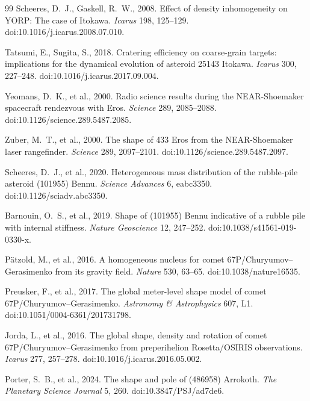 \documentclass[11pt,a4paper]{article}
\begin{document}
\begin{thebibliography}{99}
Scheeres, D.~J., Gaskell, R.~W., 2008. Effect of density inhomogeneity on YORP: The case of Itokawa. \emph{Icarus} 198, 125--129.
doi:10.1016/j.icarus.2008.07.010.

Tatsumi, E., Sugita, S., 2018. Cratering efficiency on coarse-grain
targets: implications for the dynamical evolution of asteroid 25143
Itokawa. \emph{Icarus} 300, 227--248. doi:10.1016/j.icarus.2017.09.004.

Yeomans, D.~K., et al., 2000. Radio science results during the
NEAR-Shoemaker spacecraft rendezvous with Eros. \emph{Science}
289, 2085--2088. doi:10.1126/science.289.5487.2085.

Zuber, M.~T., et al., 2000. The shape of 433 Eros from the NEAR-Shoemaker
laser rangefinder. \emph{Science} 289, 2097--2101.
doi:10.1126/science.289.5487.2097.

Scheeres, D.~J., et al., 2020. Heterogeneous mass distribution of the
rubble-pile asteroid (101955) Bennu. \emph{Science Advances} 6,
eabc3350. doi:10.1126/sciadv.abc3350.

Barnouin, O.~S., et al., 2019. Shape of (101955) Bennu indicative of a
rubble pile with internal stiffness. \emph{Nature Geoscience} 12,
247--252. doi:10.1038/s41561-019-0330-x.

P\"atzold, M., et al., 2016. A homogeneous nucleus for comet
67P/Churyumov--Gerasimenko from its gravity field. \emph{Nature} 530,
63--65. doi:10.1038/nature16535.

Preusker, F., et al., 2017. The global meter-level shape model of comet
67P/Churyumov--Gerasimenko. \emph{Astronomy \& Astrophysics} 607, L1.
doi:10.1051/0004-6361/201731798.

Jorda, L., et al., 2016. The global shape, density and rotation of comet
67P/Churyumov--Gerasimenko from preperihelion Rosetta/OSIRIS observations.
\emph{Icarus} 277, 257--278. doi:10.1016/j.icarus.2016.05.002.

Porter, S.~B., et al., 2024. The shape and pole of (486958) Arrokoth.
\emph{The Planetary Science Journal} 5, 260. doi:10.3847/PSJ/ad7de6.


\end{thebibliography}
\end{document}
